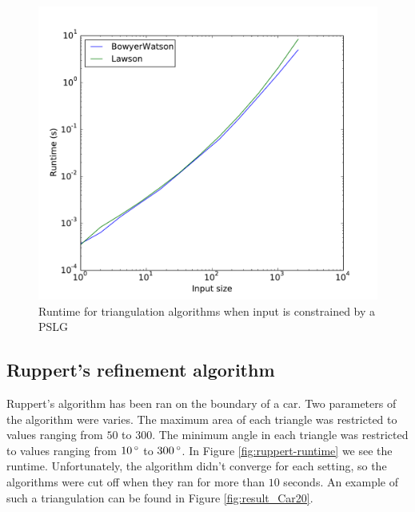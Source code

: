 \begin{figure}[ht]
    \centering
    \includegraphics[width=\columnwidth]{../images/runtime_segments.pdf}
    \caption{Runtime for triangulation algorithms when input is constrained by a PSLG}
    \label{fig:triangulation-pslg-runtime}
\end{figure}

\subsection{Ruppert's refinement algorithm}
\label{sub:results:ruppert}

Ruppert's algorithm has been ran on the boundary of a car.
Two parameters of the algorithm were varies.
The maximum area of each triangle was restricted to values ranging from $50$ to $300$.
The minimum angle in each triangle was restricted to values ranging from $10\,^{\circ}$ to $300\,^{\circ}$.
In Figure \ref{fig:ruppert-runtime} we see the runtime.
Unfortunately, the algorithm didn't converge for each setting, so the algorithms were cut off when they ran for more than $10$ seconds.
An example of such a triangulation can be found in Figure \ref{fig:result_Car20}.

